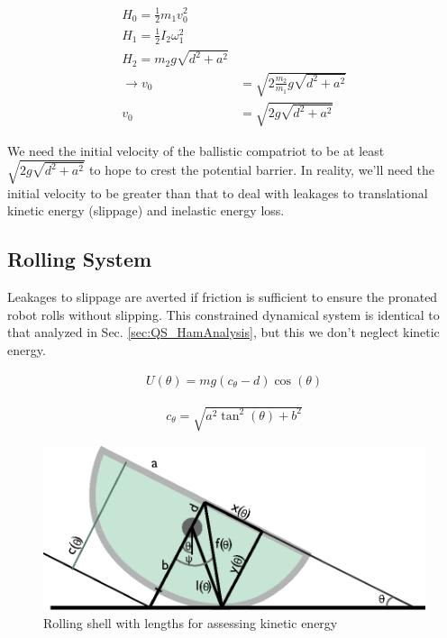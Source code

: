 \documentclass[letterpaper]{report}
\begin{document}
\begin{align}
H_0 = \frac{1}{2} m_1 v_0^2  \\
H_1 = \frac{1}{2} I_2 \omega_1^2  \\
H_2 = m_2 g \sqrt{d^2+a^2} \\
\rightarrow v_0 &= \sqrt{2 \frac{m_2}{m_1}g \sqrt{d^2+a^2}} \\
 v_0 &= \sqrt{2 g \sqrt{d^2+a^2}}
\end{align}

We need the initial velocity of the ballistic compatriot to be at least $\sqrt{2 g \sqrt{d^2+a^2}}$ to hope to crest the potential barrier.
In reality, we'll need the initial velocity to be greater than that to deal with leakages to translational kinetic energy (slippage) and inelastic energy loss.

\subsection{Rolling System} %
Leakages to slippage are averted if friction is sufficient to ensure the pronated robot rolls without slipping.
This constrained dynamical system is identical to that analyzed in Sec. \ref{sec:QS_HamAnalysis}, but this we don't neglect kinetic energy.

\begin{align}
  U(\theta) = mg(c_\theta - d) \cos(\theta)
\end{align}

\begin{align}
  c_\theta = \sqrt{a^2 \tan^2(\theta) + b^2}
\end{align}

\begin{figure}
  \centering
  \includegraphics[width=\textwidth]{Dyn_EnergyAnalysis.eps}
  \caption{Rolling shell with lengths for assessing kinetic energy}
\end{figure}
\end{document}

